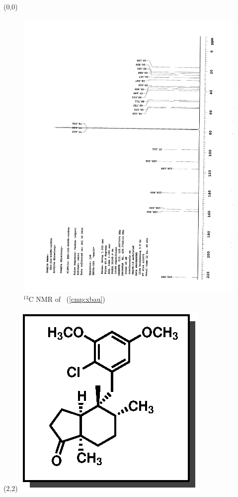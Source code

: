 \clearpage
\begin{textblock}{20}(0,0)
\begin{figure}[htb]
\caption{$^{13}$C NMR of  \CMPxbau\ (\ref{cmp:xbau})}
\includegraphics[scale=0.75, trim = 0mm 0mm 0mm 5mm,
clip]{chp_singlecarbon/images/nmr/xbauC}
\vspace{-100pt}
\end{figure}
\end{textblock}
\begin{textblock}{1}(2,2)
\includegraphics[scale=0.8, angle=90]{chp_singlecarbon/images/xbau}
\end{textblock}
\clearpage


